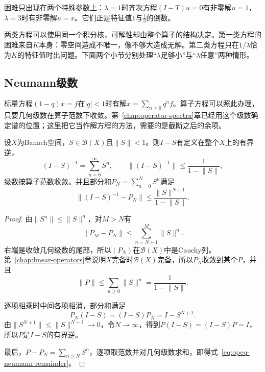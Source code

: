 困难只出现在两个特殊参数上：$\lambda=1$时齐次方程$(I-T)u=0$有非零解$u=1$，$\lambda=3$时有非零解$u=x$。它们正是特征值$1$与$\frac13$的倒数。

两类方程可以使用同一个积分核，可解性却由整个算子的结构决定。第一类方程的困难来自$K$本身：零空间造成不唯一，像不够大造成无解。第二类方程只在$1/\lambda$恰为$K$的特征值时出问题。下面两个小节分别处理“$\lambda$足够小”与“$\lambda$任意”两种情形。

\subsection{Neumann级数}
\label{sec:opeq-neumann}

标量方程$(1-q)x=f$在$\lvert q\rvert<1$时有解$x=\sum_{n\geq0}q^nf$。算子方程可以照此办理，只要几何级数在算子范数下收敛。第~\ref{chap:operator-spectra}章已经用这个级数确定谱的位置；这里把它当作解方程的方法，需要的是截断之后的余项。

\begin{theorem}[Neumann级数]
\label{thm:opeq-neumann}
设$X$为Banach空间，$S\in\mathcal B(X)$且$\lVert S\rVert<1$。则$I-S$有定义在整个$X$上的有界逆，
\begin{equation}
  (I-S)^{-1}=\sum_{n=0}^{\infty}S^n,\qquad
  \lVert(I-S)^{-1}\rVert\leq\frac{1}{1-\lVert S\rVert},
  \label{eq:opeq-neumann}
\end{equation}
级数按算子范数收敛。并且部分和$P_N=\sum_{n=0}^NS^n$满足
\begin{equation}
  \bigl\lVert(I-S)^{-1}-P_N\bigr\rVert\leq\frac{\lVert S\rVert^{N+1}}{1-\lVert S\rVert}.
  \label{eq:opeq-neumann-remainder}
\end{equation}
\end{theorem}

\begin{proof}
由$\lVert S^n\rVert\leq\lVert S\rVert^n$，对$M>N$有
\[
  \lVert P_M-P_N\rVert\leq\sum_{n=N+1}^M\lVert S\rVert^n.
\]
右端是收敛几何级数的尾部，所以$(P_N)$在$\mathcal B(X)$中是Cauchy列。第~\ref{chap:linear-operators}章说明$X$完备时$\mathcal B(X)$完备，所以$P_N$收敛到某个$P$，并且
\[
  \lVert P\rVert\leq\sum_{n\geq0}\lVert S\rVert^n=\frac1{1-\lVert S\rVert}.
\]

逐项相乘时中间各项相消，部分和满足
\[
  P_N(I-S)=(I-S)P_N=I-S^{N+1}.
\]
由$\lVert S^{N+1}\rVert\leq\lVert S\rVert^{N+1}\to0$，令$N\to\infty$，得到$P(I-S)=(I-S)P=I$，所以$P$是$I-S$的有界逆。

最后，$P-P_N=\sum_{n>N}S^n$，逐项取范数并对几何级数求和，即得式~\eqref{eq:opeq-neumann-remainder}。
\end{proof}

